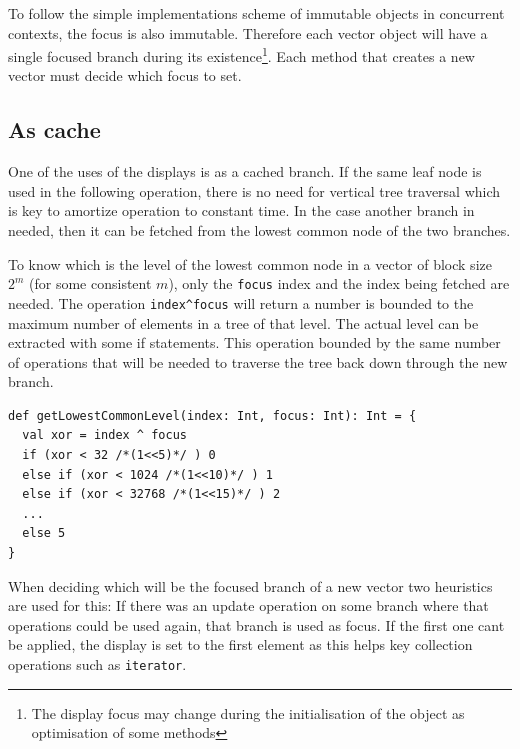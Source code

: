 To follow the simple implementations scheme of immutable objects in concurrent contexts, the focus is also immutable. Therefore each vector object will have a single focused branch during its existence\footnote{The display focus may change during the initialisation of the object as optimisation of some methods}. Each method that creates a new vector must decide which focus to set. 


\subsection{As cache}
One of the uses of the displays is as a cached branch. If the same leaf node is used in the following operation, there is no need for vertical tree traversal which is key to amortize operation to constant time. In the case another branch in needed, then it can be fetched from the lowest common node of the two branches. 

To know which is the level of the lowest common node in a vector of block size $2^m$ (for some consistent $m$), only the \texttt{focus} index and the index being fetched are needed. The operation \texttt{index\^{ }focus} will return a number is bounded to the maximum number of elements in a tree of that level. The actual level can be extracted with some if statements. This operation bounded by the same number of operations that will be needed to traverse the tree back down through the new branch.

\begin{lstlisting}[frame=single]
def getLowestCommonLevel(index: Int, focus: Int): Int = {
  val xor = index ^ focus
  if (xor < 32 /*(1<<5)*/ ) 0
  else if (xor < 1024 /*(1<<10)*/ ) 1
  else if (xor < 32768 /*(1<<15)*/ ) 2
  ...
  else 5
}
\end{lstlisting}

When deciding which will be the focused branch of a new vector two heuristics are used for this: If there was an update operation on some branch where that operations could be used again, that branch is used as focus. If the first one cant be applied, the display is set to the first element as this helps key collection operations such as \texttt{iterator}.


